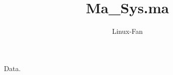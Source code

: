 \documentclass[paper=a4, DIV9, 12pt, abstracton, headings=normal,
						captions=tableheading]{scrartcl}
\begin{document}
\author{Linux-Fan}
\title{Ma\_Sys.ma}
\maketitle

\tableofcontents


Data.

\end{document}
